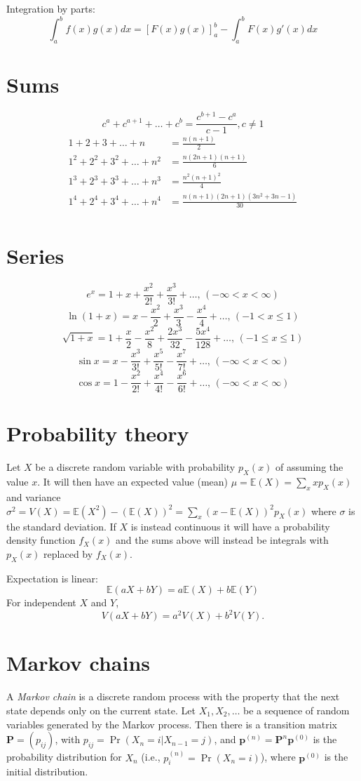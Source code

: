 Integration by parts:
\[\int_a^bf(x)g(x)dx = [F(x)g(x)]_a^b-\int_a^bF(x)g'(x)dx\]

\section{Sums}
\[ c^a + c^{a+1} + \dots + c^{b} = \frac{c^{b+1} - c^a}{c-1}, c \neq 1 \]
\begin{align*}
	1 + 2 + 3 + \dots + n &= \frac{n(n+1)}{2} \\
	1^2 + 2^2 + 3^2 + \dots + n^2 &= \frac{n(2n+1)(n+1)}{6} \\
	1^3 + 2^3 + 3^3 + \dots + n^3 &= \frac{n^2(n+1)^2}{4} \\
	1^4 + 2^4 + 3^4 + \dots + n^4 &= \frac{n(n+1)(2n+1)(3n^2 + 3n - 1)}{30} \\
\end{align*}

\section{Series}
$$e^x = 1+x+\frac{x^2}{2!}+\frac{x^3}{3!}+\dots,\,(-\infty<x<\infty)$$
$$\ln(1+x) = x-\frac{x^2}{2}+\frac{x^3}{3}-\frac{x^4}{4}+\dots,\,(-1<x\leq1)$$
$$\sqrt{1+x} = 1+\frac{x}{2}-\frac{x^2}{8}+\frac{2x^3}{32}-\frac{5x^4}{128}+\dots,\,(-1\leq x\leq1)$$
$$\sin x = x-\frac{x^3}{3!}+\frac{x^5}{5!}-\frac{x^7}{7!}+\dots,\,(-\infty<x<\infty)$$
$$\cos x = 1-\frac{x^2}{2!}+\frac{x^4}{4!}-\frac{x^6}{6!}+\dots,\,(-\infty<x<\infty)$$

\section{Probability theory}
Let $X$ be a discrete random variable with probability $p_X(x)$ of assuming the value $x$. It will then have an expected value (mean) $\mu=\mathbb{E}(X)=\sum_xxp_X(x)$ and variance $\sigma^2=V(X)=\mathbb{E}(X^2)-(\mathbb{E}(X))^2=\sum_x(x-\mathbb{E}(X))^2p_X(x)$ where $\sigma$ is the standard deviation. If $X$ is instead continuous it will have a probability density function $f_X(x)$ and the sums above will instead be integrals with $p_X(x)$ replaced by $f_X(x)$.

Expectation is linear:
\[\mathbb{E}(aX+bY) = a\mathbb{E}(X)+b\mathbb{E}(Y)\]
For independent $X$ and $Y$, \[V(aX+bY) = a^2V(X)+b^2V(Y).\]

\section{Markov chains}
A \emph{Markov chain} is a discrete random process with the property that the next state depends only on the current state.
Let $X_1,X_2,\ldots$ be a sequence of random variables generated by the Markov process.
Then there is a transition matrix $\mathbf{P} = (p_{ij})$, with $p_{ij} = \Pr(X_n = i | X_{n-1} = j)$,
and $\mathbf{p}^{(n)} = \mathbf P^n \mathbf p^{(0)}$ is the probability distribution for $X_n$ (i.e., $p^{(n)}_i = \Pr(X_n = i)$),
where $\mathbf{p}^{(0)}$ is the initial distribution.

